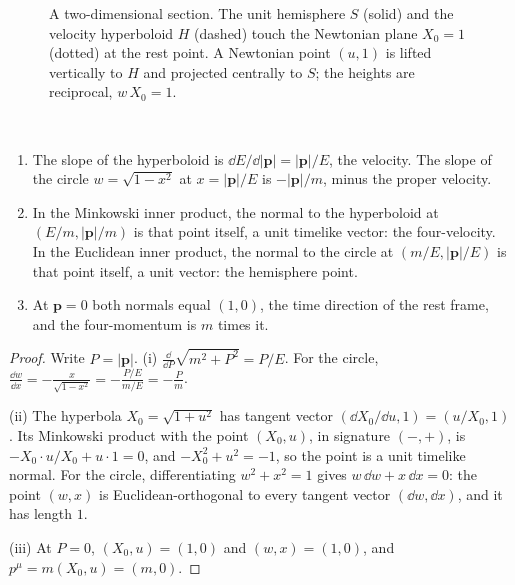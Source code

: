 \begin{figure}[t]
\centering
{}
\caption{A two-dimensional section. The unit hemisphere $S$ (solid) and the velocity hyperboloid $H$ (dashed) touch the Newtonian plane $X_0=1$ (dotted) at the rest point. A Newtonian point $(u,1)$ is lifted vertically to $H$ and projected centrally to $S$; the heights are reciprocal, $w\,X_0=1$.}
\label{fig:threesurfaces}
\end{figure}

\begin{proposition}\label{prop:normals}\ver\
\begin{enumerate}[label=(\roman*)]
\item The slope of the hyperboloid is $\dd E/\dd|\mathbf p|=|\mathbf p|/E$, the velocity. The slope of the circle $w=\sqrt{1-x^2}$ at $x=|\mathbf p|/E$ is $-|\mathbf p|/m$, minus the proper velocity.
\item In the Minkowski inner product, the normal to the hyperboloid at $(E/m,|\mathbf p|/m)$ is that point itself, a unit timelike vector: the four-velocity. In the Euclidean inner product, the normal to the circle at $(m/E,|\mathbf p|/E)$ is that point itself, a unit vector: the hemisphere point.
\item At $\mathbf p=0$ both normals equal $(1,0)$, the time direction of the rest frame, and the four-momentum is $m$ times it.
\end{enumerate}
\end{proposition}
\begin{proof}
Write $P=|\mathbf p|$. (i) $\frac{\dd}{\dd P}\sqrt{m^2+P^2}=P/E$. For the circle, $\frac{\dd w}{\dd x}=-\frac x{\sqrt{1-x^2}}=-\frac{P/E}{m/E}=-\frac Pm$.

(ii) The hyperbola $X_0=\sqrt{1+u^2}$ has tangent vector $(\dd X_0/\dd u,1)=(u/X_0,1)$. Its Minkowski product with the point $(X_0,u)$, in signature $(-,+)$, is $-X_0\cdot u/X_0+u\cdot1=0$, and $-X_0^2+u^2=-1$, so the point is a unit timelike normal. For the circle, differentiating $w^2+x^2=1$ gives $w\,\dd w+x\,\dd x=0$: the point $(w,x)$ is Euclidean-orthogonal to every tangent vector $(\dd w,\dd x)$, and it has length $1$.

(iii) At $P=0$, $(X_0,u)=(1,0)$ and $(w,x)=(1,0)$, and $p^\mu=m(X_0,u)=(m,0)$.
\end{proof}


